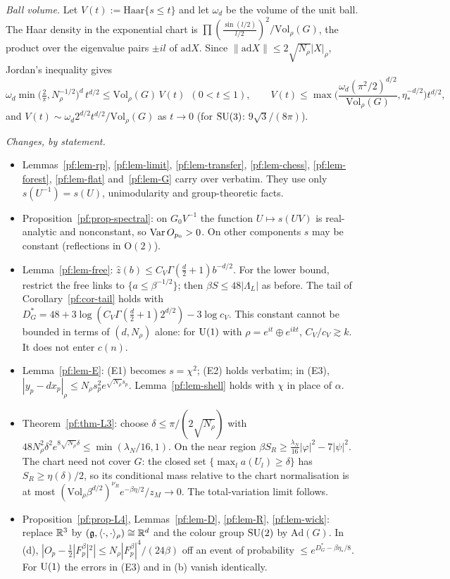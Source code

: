 \emph{Ball volume.} Let $V(t):=\mathrm{Haar}\{s\le t\}$ and let $\omega_d$ be the volume of the unit ball. The Haar density in the exponential chart is $\prod(\frac{\sin(l/2)}{l/2})^2/\mathrm{Vol}_\rho(G)$, the product over the eigenvalue pairs $\pm il$ of $\mathrm{ad}X$. Since $\|\mathrm{ad}X\|\le2\sqrt{N_\rho}|X|_\rho$, Jordan's inequality gives
\[
\omega_d\min\big(\tfrac2\pi,N_\rho^{-1/2}\big)^d\,t^{d/2}\le \mathrm{Vol}_\rho(G)\,V(t)\ \ (0<t\le1),\qquad V(t)\le\max\Big(\frac{\omega_d(\pi^2/2)^{d/2}}{\mathrm{Vol}_\rho(G)},\eta_*^{-d/2}\Big)t^{d/2},
\]
and $V(t)\sim\omega_d2^{d/2}t^{d/2}/\mathrm{Vol}_\rho(G)$ as $t\to0$ (for $\mathrm{SU}(3)$: $9\sqrt3/(8\pi)$).

\emph{Changes, by statement.}
\begin{itemize}
\item[(i)] Lemmas~\ref{pf:lem-rp}, \ref{pf:lem-limit}, \ref{pf:lem-transfer}, \ref{pf:lem-chess}, \ref{pf:lem-forest}, \ref{pf:lem-flat} and~\ref{pf:lem-G} carry over verbatim. They use only $s(U^{-1})=s(U)$, unimodularity and group-theoretic facts.
\item[(ii)] Proposition~\ref{pf:prop-spectral}: on $G_0V^{-1}$ the function $U\mapsto s(UV)$ is real-analytic and nonconstant, so $\operatorname{Var} O_{p_0}>0$. On other components $s$ may be constant (reflections in $\mathrm O(2)$).
\item[(iii)] Lemma~\ref{pf:lem-free}: $\hat z(b)\le C_V\Gamma(\frac d2+1)b^{-d/2}$. For the lower bound, restrict the free links to $\{a\le\beta^{-1/2}\}$; then $\beta S\le48|\Lambda_L|$ as before. The tail of Corollary~\ref{pf:cor-tail} holds with $D^*_G=48+3\log(C_V\Gamma(\frac d2+1)2^{d/2})-3\log c_V$. This constant cannot be bounded in terms of $(d,N_\rho)$ alone: for $\mathrm{U}(1)$ with $\rho=e^{it}\oplus e^{ikt}$, $C_V/c_V\gtrsim k$. It does not enter $c(n)$.
\item[(iv)] Lemma~\ref{pf:lem-E}: (E1) becomes $s=\chi^2$; (E2) holds verbatim; in (E3), $|y_p-dx_p|_\rho\le N_\rho s_p^2e^{\sqrt{N_\rho}s_p}$. Lemma~\ref{pf:lem-shell} holds with $\chi$ in place of $\alpha$.
\item[(v)] Theorem~\ref{pf:thm-L3}: choose $\delta\le\pi/(2\sqrt{N_\rho})$ with $48N_\rho^2\delta^2e^{8\sqrt{N_\rho}\delta}\le\min(\lambda_N/16,1)$. On the near region $\beta S_R\ge\frac{\lambda_N}{16}|\varphi|^2-7|\psi|^2$. The chart need not cover $G$: the closed set $\{\max_la(U_l)\ge\delta\}$ has $S_R\ge\eta(\delta)/2$, so its conditional mass relative to the chart normalisation is at most $(\mathrm{Vol}_\rho\beta^{d/2})^{\nu_R}e^{-\beta\eta/2}/z_M\to0$. The total-variation limit follows.
\item[(vi)] Proposition~\ref{pf:prop-L4}, Lemmas~\ref{pf:lem-D}, \ref{pf:lem-R}, \ref{pf:lem-wick}: replace $\mathbb{R}^3$ by $(\mathfrak g,\langle\cdot,\cdot\rangle_\rho)\cong\mathbb{R}^d$ and the colour group $\mathrm{SU}(2)$ by $\mathrm{Ad}(G)$. In (d), $|O_p-\frac12|F^\beta_p|^2|\le N_\rho|F^\beta_p|^4/(24\beta)$ off an event of probability $\le e^{D^*_G-\beta\eta_*/8}$. For $\mathrm{U}(1)$ the errors in (E3) and in (b) vanish identically.
\end{itemize}

